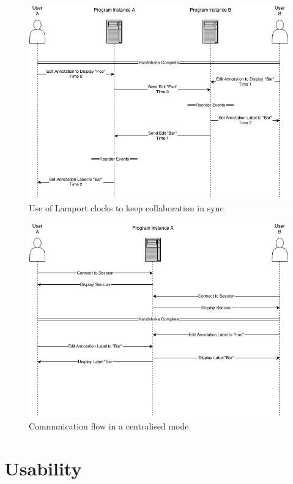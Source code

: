 \begin{figure}[h!]
    \centering
    \includegraphics[width=\textwidth]{images/minf_collab_mixup_fix.png}
    \caption{Use of Lamport clocks to keep collaboration in sync}
    \label{fig:collab_mixup_fix}
\end{figure}

\begin{figure}[h!]
    \centering
    \includegraphics[width=\textwidth]{images/collaboration_single_instance.png}
    \caption{Communication flow in a centralised mode}
    \label{fig:collab_mixup_fix}
\end{figure}


\section{Usability}

